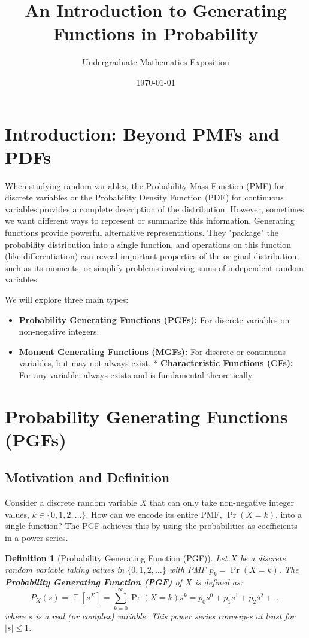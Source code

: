 \documentclass[11pt, letterpaper]{article}
\title{An Introduction to Generating Functions in Probability}
\author{Undergraduate Mathematics Exposition} %
\date{\today}
\newtheorem{definition}[theorem]{Definition}
\DeclareMathOperator{\E}{\mathbb{E}}
\begin{document}
\maketitle

\section{Introduction: Beyond PMFs and PDFs}

When studying random variables, the Probability Mass Function (PMF) for discrete variables or the Probability Density Function (PDF) for continuous variables provides a complete description of the distribution. However, sometimes we want different ways to represent or summarize this information. Generating functions provide powerful alternative representations. They "package" the probability distribution into a single function, and operations on this function (like differentiation) can reveal important properties of the original distribution, such as its moments, or simplify problems involving sums of independent random variables.

We will explore three main types:
\begin{itemize}
    \item \textbf{Probability Generating Functions (PGFs):} For discrete variables on non-negative integers.
    \item \textbf{Moment Generating Functions (MGFs):} For discrete or continuous variables, but may not always exist.
    * \textbf{Characteristic Functions (CFs):} For any variable; always exists and is fundamental theoretically.
\end{itemize}

\section{Probability Generating Functions (PGFs)}

\subsection{Motivation and Definition}

Consider a discrete random variable $X$ that can only take non-negative integer values, $k \in \{0, 1, 2, \dots\}$. How can we encode its entire PMF, $\Pr(X=k)$, into a single function? The PGF achieves this by using the probabilities as coefficients in a power series.

\begin{definition}[Probability Generating Function (PGF)]
Let $X$ be a discrete random variable taking values in $\{0, 1, 2, \dots\}$ with PMF $p_k = \Pr(X=k)$. The \textbf{Probability Generating Function (PGF)} of $X$ is defined as:
\begin{equation}
    P_X(s) = \E[s^X] = \sum_{k=0}^{\infty} \Pr(X=k) s^k = p_0 s^0 + p_1 s^1 + p_2 s^2 + \dots
\end{equation}
where $s$ is a real (or complex) variable. This power series converges at least for $|s| \le 1$.
\end{definition}
\end{document}
